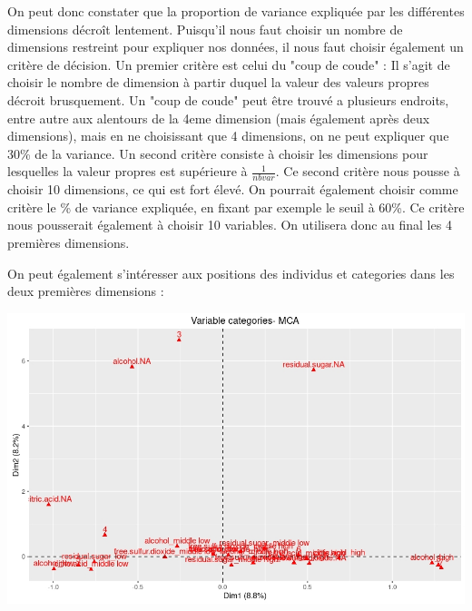 \documentclass[11pt,a4paper]{article}
\begin{document}
On peut donc constater que la proportion de variance expliquée par les différentes dimensions décroît lentement. Puisqu'il nous faut choisir un nombre de dimensions restreint pour expliquer nos données, il nous faut choisir également un critère de décision. Un premier critère est celui du "coup de coude" : Il s'agit de choisir le nombre de dimension à partir duquel la valeur des valeurs propres décroit brusquement. Un "coup de coude" peut être trouvé a plusieurs endroits, entre autre aux alentours de la 4eme dimension (mais également après deux dimensions), mais en ne choisissant que 4 dimensions, on ne peut expliquer que 30\% de la variance. Un second critère consiste à choisir les dimensions pour lesquelles la valeur propres est supérieure à $\frac{1}{nbvar}$. Ce second critère nous pousse à choisir 10 dimensions, ce qui est fort élevé. On pourrait également choisir comme critère le \% de variance expliquée, en fixant par exemple le seuil à 60\%. Ce critère nous pousserait également à choisir 10 variables. On utilisera  donc au final les 4 premières dimensions.\bigskip

On peut également s'intéresser aux positions des individus et categories dans les deux premières dimensions :

\begin{center}
\includegraphics[scale=0.6]{"biplot-mca"}
\end{center}
\end{document}
